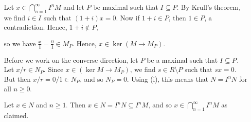 Let $x \in \bigcap_{n=1}^\infty I^nM$ and let $P$ be maximal such that $I \subseteq P$.
By Krull's theorem, we find $i \in I$ such that $(1+i)x = 0$. Now if
$1 + i \in P$, then $1 \in P$, a contradiction. Hence, $1 + i\notin P$,

so we have $\frac{x}{1} = \frac{0}{1} \in M_P$. Hence, $x \in \ker (M\to M_P)$.

Before we work on the converse direction, let $P$ be a maximal such that
$I \subseteq P$. Let $x/r \in N_P$. Since $x \in (\ker M\to M_P)$, we find
$s \in R\setminus P$ such that $sx = 0$. But then $x/r = 0/1 \in N_P$, and so
$N_P = 0$. Using (i), this means that $N = I^nN$ for all $n\geq 0$.

Let $x \in N$ and $n \geq 1$. Then $x \in N = I^nN \subseteq I^nM$, and so
$x \in \bigcap_{n=1}^\infty I^nM$ as claimed.
